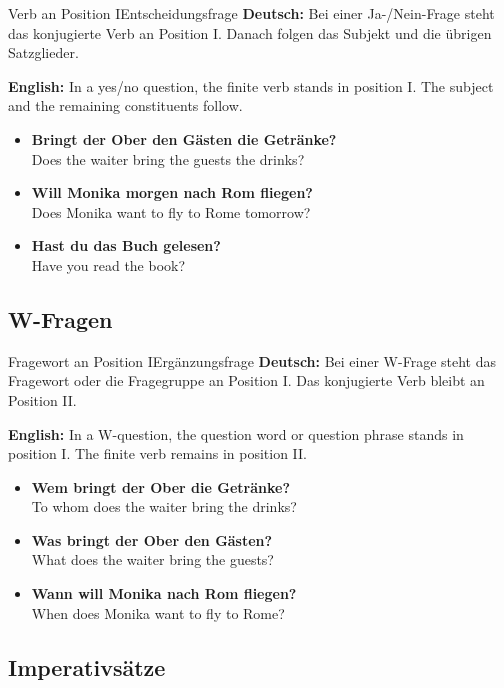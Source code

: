 \documentclass[a4paper,11pt]{article}
\newcommand{\GermanText}[1]{\textbf{Deutsch: }#1\par}
\newcommand{\EnglishText}[1]{{\small\color{SoftGray}\textbf{English: }#1\par}}
\newcommand{\ExampleItem}[2]{\item \textbf{#1}\\{\small\color{SoftGray}#2}}
\begin{document}
            \begin{grammarentry}{Verb an Position I}{Entscheidungsfrage}
                \GermanText{Bei einer Ja-/Nein-Frage steht das konjugierte Verb an Position I. Danach folgen das Subjekt und die übrigen Satzglieder.}
                \EnglishText{In a yes/no question, the finite verb stands in position I. The subject and the remaining constituents follow.}
            \end{grammarentry}
            
            \begin{exbox}
                \begin{itemize}
                    \ExampleItem{Bringt der Ober den Gästen die Getränke?}{Does the waiter bring the guests the drinks?}
                    \ExampleItem{Will Monika morgen nach Rom fliegen?}{Does Monika want to fly to Rome tomorrow?}
                    \ExampleItem{Hast du das Buch gelesen?}{Have you read the book?}
                \end{itemize}
            \end{exbox}
        
        \subsection{W-Fragen}
            
            \begin{grammarentry}{Fragewort an Position I}{Ergänzungsfrage}
                \GermanText{Bei einer W-Frage steht das Fragewort oder die Fragegruppe an Position I. Das konjugierte Verb bleibt an Position II.}
                \EnglishText{In a W-question, the question word or question phrase stands in position I. The finite verb remains in position II.}
            \end{grammarentry}
            
            \begin{exbox}
                \begin{itemize}
                    \ExampleItem{Wem bringt der Ober die Getränke?}{To whom does the waiter bring the drinks?}
                    \ExampleItem{Was bringt der Ober den Gästen?}{What does the waiter bring the guests?}
                    \ExampleItem{Wann will Monika nach Rom fliegen?}{When does Monika want to fly to Rome?}
                \end{itemize}
            \end{exbox}
        
        \subsection{Imperativsätze}
            
\end{document}
